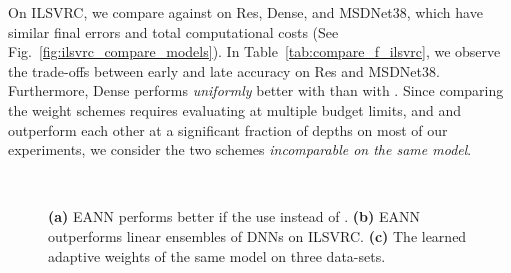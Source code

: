 On ILSVRC, we compare \adaloss against \const on Res, Dense, and MSDNet38, which have similar final errors and total computational costs (See Fig.~\ref{fig:ilsvrc_compare_models}). In Table~\ref{tab:compare_f_ilsvrc}, we observe the trade-offs between early and late accuracy on Res and MSDNet38. Furthermore, Dense performs \emph{uniformly} better with \adaloss than with \const. 
Since comparing the weight schemes requires evaluating \anns at multiple budget limits, and \adaloss and \const outperform each other at a significant fraction of depths on most of our experiments, we consider the two schemes \emph{incomparable on the same model}. 

\begin{figure*}[t]
    \centering
    ~
    
    \caption{ \textbf{(a)} EANN performs better if the \anns use \adaloss instead of \const. 
    \textbf{(b)} EANN outperforms linear ensembles of DNNs on ILSVRC.
    \textbf{(c)} The learned adaptive weights of the same model on three data-sets.
    }
\end{figure*}


